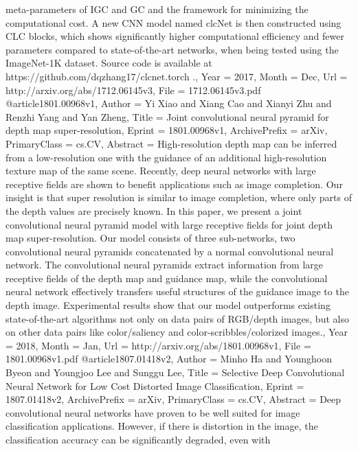 {{{{{meta-parameters of IGC and GC and the framework for minimizing the
computational cost. A new CNN model named clcNet is then constructed using CLC
blocks, which shows significantly higher computational efficiency and fewer
parameters compared to state-of-the-art networks, when being tested using the
ImageNet-1K dataset. Source code is available at
https://github.com/dqzhang17/clcnet.torch .},
Year          = {2017},
Month         = {Dec},
Url           = {http://arxiv.org/abs/1712.06145v3},
File          = {1712.06145v3.pdf}
}
@article{1801.00968v1,
Author        = {Yi Xiao and Xiang Cao and Xianyi Zhu and Renzhi Yang and Yan Zheng},
Title         = {Joint convolutional neural pyramid for depth map super-resolution},
Eprint        = {1801.00968v1},
ArchivePrefix = {arXiv},
PrimaryClass  = {cs.CV},
Abstract      = {High-resolution depth map can be inferred from a low-resolution one with the
guidance of an additional high-resolution texture map of the same scene.
Recently, deep neural networks with large receptive fields are shown to benefit
applications such as image completion. Our insight is that super resolution is
similar to image completion, where only parts of the depth values are precisely
known. In this paper, we present a joint convolutional neural pyramid model
with large receptive fields for joint depth map super-resolution. Our model
consists of three sub-networks, two convolutional neural pyramids concatenated
by a normal convolutional neural network. The convolutional neural pyramids
extract information from large receptive fields of the depth map and guidance
map, while the convolutional neural network effectively transfers useful
structures of the guidance image to the depth image. Experimental results show
that our model outperforms existing state-of-the-art algorithms not only on
data pairs of RGB/depth images, but also on other data pairs like
color/saliency and color-scribbles/colorized images.},
Year          = {2018},
Month         = {Jan},
Url           = {http://arxiv.org/abs/1801.00968v1},
File          = {1801.00968v1.pdf}
}
@article{1807.01418v2,
Author        = {Minho Ha and Younghoon Byeon and Youngjoo Lee and Sunggu Lee},
Title         = {Selective Deep Convolutional Neural Network for Low Cost Distorted Image
  Classification},
Eprint        = {1807.01418v2},
ArchivePrefix = {arXiv},
PrimaryClass  = {cs.CV},
Abstract      = {Deep convolutional neural networks have proven to be well suited for image
classification applications. However, if there is distortion in the image, the
classification accuracy can be significantly degraded, even with
}}}}}
